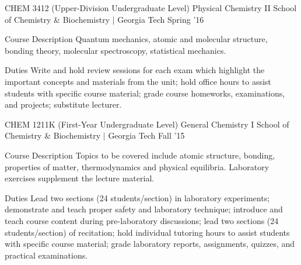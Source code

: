 \begin{cventries}
  \cvteachingentry
    {CHEM 3412 (Upper-Division Undergraduate Level)} %
    {Physical Chemistry II} %
    {School of Chemistry \& Biochemistry $\vert$ Georgia Tech} %
    {Spring '16} %
    {%
    \begin{cvdescription}
    \item[Course Description] Quantum mechanics, atomic and molecular structure, bonding
        theory, molecular spectroscopy, statistical mechanics. 
    \item[Duties] Write and hold review sessions for each exam which highlight the
        important concepts and materials from the unit; hold office hours to assist
        students with specific course material; grade course homeworks, examinations, 
        and projects; substitute lecturer.
    \end{cvdescription}
    }

  \cvteachingentry
    {CHEM 1211K (First-Year Undergraduate Level)} %
    {General Chemistry I} %
    {School of Chemistry \& Biochemistry $\vert$ Georgia Tech} %
    {Fall '15} %
    {%
    \begin{cvdescription}
    \item[Course Description] Topics to be covered include atomic structure, bonding, 
        properties of matter, thermodynamics and physical equilibria. Laboratory 
        exercises supplement the lecture material.
    \item[Duties] Lead two sections (24 students/section) in laboratory experiments; 
        demonstrate and teach proper safety and laboratory technique; introduce and 
        teach course content during pre-laboratory discussions; lead two sections (24
        students/section) of recitation; hold individual tutoring hours to assist 
        students with specific course material; grade laboratory reports, assignments, 
        quizzes, and practical examinations.
    \end{cvdescription}
    }

\end{cventries}
